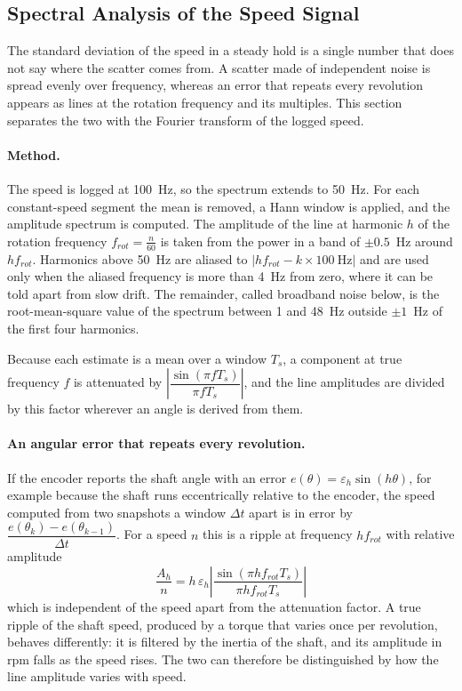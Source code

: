 \subsection{Spectral Analysis of the Speed Signal}
\label{subsec:agit-fft}

The standard deviation of the speed in a steady hold is a single number that does not say where the scatter comes from. A scatter made of independent noise is spread evenly over frequency, whereas an error that repeats every revolution appears as lines at the rotation frequency and its multiples. This section separates the two with the Fourier transform of the logged speed.

\paragraph{Method.}
The speed is logged at 100~Hz, so the spectrum extends to 50~Hz. For each constant-speed segment the mean is removed, a Hann window is applied, and the amplitude spectrum is computed. The amplitude of the line at harmonic $h$ of the rotation frequency $f_{rot} = \frac{n}{60}$ is taken from the power in a band of $\pm 0.5$~Hz around $h f_{rot}$. Harmonics above 50~Hz are aliased to $|h f_{rot} - k \times 100\ \text{Hz}|$ and are used only when the aliased frequency is more than 4~Hz from zero, where it can be told apart from slow drift. The remainder, called broadband noise below, is the root-mean-square value of the spectrum between 1 and 48~Hz outside $\pm 1$~Hz of the first four harmonics.

Because each estimate is a mean over a window $T_s$, a component at true frequency $f$ is attenuated by $\left|\dfrac{\sin(\pi f T_s)}{\pi f T_s}\right|$, and the line amplitudes are divided by this factor wherever an angle is derived from them.

\paragraph{An angular error that repeats every revolution.}
If the encoder reports the shaft angle with an error $e(\theta) = \varepsilon_h \sin(h\theta)$, for example because the shaft runs eccentrically relative to the encoder, the speed computed from two snapshots a window $\Delta t$ apart is in error by $\dfrac{e(\theta_k) - e(\theta_{k-1})}{\Delta t}$. For a speed $n$ this is a ripple at frequency $h f_{rot}$ with relative amplitude
\begin{equation}
    \frac{A_h}{n} = h\, \varepsilon_h \left| \frac{\sin(\pi h f_{rot} T_s)}{\pi h f_{rot} T_s} \right|
    \label{eq:ripple}
\end{equation}
which is independent of the speed apart from the attenuation factor. A true ripple of the shaft speed, produced by a torque that varies once per revolution, behaves differently: it is filtered by the inertia of the shaft, and its amplitude in rpm falls as the speed rises. The two can therefore be distinguished by how the line amplitude varies with speed.

